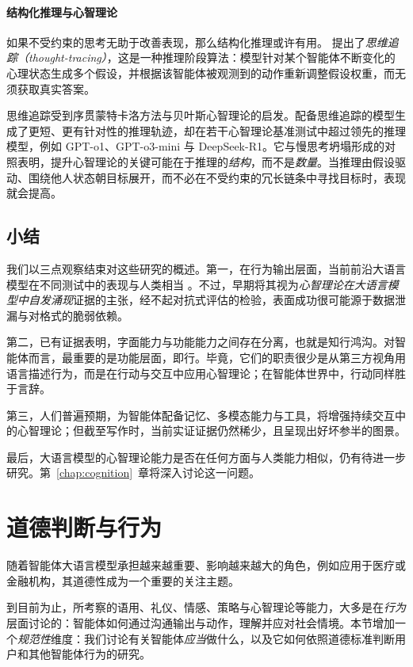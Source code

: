 \paragraph{结构化推理与心智理论}
如果不受约束的思考无助于改善表现，那么结构化推理或许有用。\citet{kim2025hypothesis} 提出了\emph{思维追踪（thought-tracing）}，这是一种推理阶段算法：模型针对某个智能体不断变化的心理状态生成多个假设，并根据该智能体被观测到的动作重新调整假设权重，而无须获取真实答案。

思维追踪受到序贯蒙特卡洛方法与贝叶斯心智理论的启发。配备思维追踪的模型生成了更短、更有针对性的推理轨迹，却在若干心智理论基准测试中超过领先的推理模型，例如 GPT-o1、GPT-o3-mini 与 DeepSeek-R1。它与慢思考坍塌形成的对照表明，提升心智理论的关键可能在于推理的\emph{结构}，而不是\emph{数量}。当推理由假设驱动、围绕他人状态朝目标展开，而不必在不受约束的冗长链条中寻找目标时，表现就会提高。

\subsection{小结}
我们以三点观察结束对这些研究的概述。第一，在行为输出层面，当前前沿大语言模型在不同测试中的表现与人类相当 \citep{van2023theory, strachan2024gpt4oreadsmindeyes, jones2024comparing}。不过，早期将其视为{\em 心智理论在大语言模型中自发涌现}证据的主张，经不起对抗式评估的检验，表面成功很可能源于数据泄漏与对格式的脆弱依赖。

第二，已有证据表明，字面能力与功能能力之间存在分离，也就是知行鸿沟。对智能体而言，最重要的是功能层面，即行。毕竟，它们的职责很少是从第三方视角用语言描述行为，而是在行动与交互中应用心智理论；在智能体世界中，行动同样胜于言辞。

第三，人们普遍预期，为智能体配备记忆、多模态能力与工具，将增强持续交互中的心智理论；但截至写作时，当前实证证据仍然稀少，且呈现出好坏参半的图景。

最后，大语言模型的心智理论能力是否在任何方面与人类能力相似，仍有待进一步研究。第~\ref{chap:cognition}~章将深入讨论这一问题。

\section{道德判断与行为} \label{sec:moral}
随着智能体大语言模型承担越来越重要、影响越来越大的角色，例如应用于医疗或金融机构，其道德性成为一个重要的关注主题。

到目前为止，所考察的语用、礼仪、情感、策略与心智理论等能力，大多是在\emph{行为}层面讨论的：智能体如何通过沟通输出与动作，理解并应对社会情境。本节增加一个\emph{规范性}维度：我们讨论有关智能体\emph{应当}做什么，以及它如何依照道德标准判断用户和其他智能体行为的研究。

